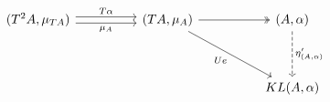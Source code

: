 \[\begin{tikzcd}
	{(T^{2}A,\mu_{TA})} && {(TA,\mu_{A})} && {(A,\alpha)} \\
	\\
	&&&& {KL(A,\alpha)}
	\arrow["T\alpha", shift left, from=1-1, to=1-3]
	\arrow["{\mu_{A}}"', shift right, from=1-1, to=1-3]
	\arrow[two heads, from=1-3, to=1-5]
	\arrow["Ue"', from=1-3, to=3-5]
	\arrow["{\eta'_{(A,\alpha)}}", dashed, from=1-5, to=3-5]
\end{tikzcd}\]